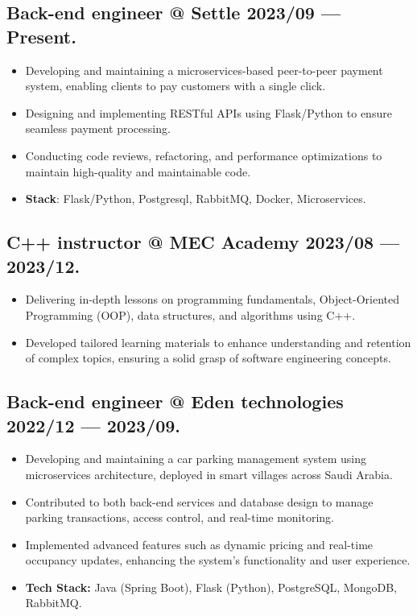 \documentclass[a4,10pt]{article}
\newenvironment{zitemize}{
\begin{itemize}\itemsep0pt \parskip0pt \parsep1pt}
{\end{itemize}\vspace{-0.5cm}}
\begin{document}
\subsection*{Back-end engineer @ Settle \hfill 2023/09 --- Present.} 
    \begin{zitemize}
        \item Developing and maintaining a microservices-based peer-to-peer payment system, enabling clients to pay customers with a single click.
        \item Designing and implementing RESTful APIs using Flask/Python to ensure seamless payment processing.
        \item Conducting code reviews, refactoring, and performance optimizations to maintain high-quality and maintainable code.

        \item \textbf{Stack}: Flask/Python, Postgresql, RabbitMQ, Docker, Microservices.
    \end{zitemize}

\subsection*{C++ instructor @ MEC Academy \hfill 2023/08 --- 2023/12.} 
    \begin{zitemize}
        \item Delivering in-depth lessons on programming fundamentals, Object-Oriented Programming (OOP), 
        data structures, and algorithms using C++.
        \item Developed tailored learning materials to enhance understanding and retention of complex topics, ensuring a solid grasp of software 
        engineering concepts.

    \end{zitemize}

\subsection*{Back-end engineer @ Eden technologies \hfill 2022/12 --- 2023/09.} 
    \begin{zitemize}
        \item Developing and maintaining a car parking management system using microservices architecture, deployed in smart villages across Saudi Arabia.
        \item Contributed to both back-end services and database design to manage parking transactions, access control, and real-time monitoring.
        \item Implemented advanced features such as dynamic pricing and real-time occupancy updates, enhancing the system’s functionality and user experience.
        \item \textbf{Tech Stack:} Java (Spring Boot), Flask (Python), PostgreSQL, MongoDB, RabbitMQ.
    \end{zitemize}
\end{document}
